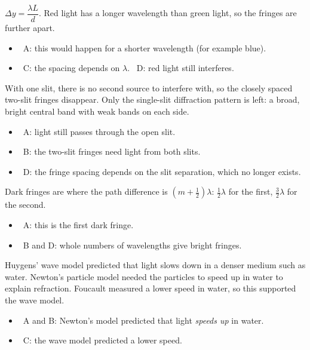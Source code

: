 \documentclass[12pt]{article}
\begin{document}
\begin{practiceanswers}
\begin{practiceans}
  $\Delta y = \dfrac{\lambda L}{d}$. Red light has a longer wavelength than green light, so the fringes
  are further apart.
  \begin{itemize}
    \item \xmark\ A: this would happen for a shorter wavelength (for example blue).
    \item \xmark\ C: the spacing depends on $\lambda$. \quad \xmark\ D: red light still interferes.
  \end{itemize}
\end{practiceans}

\begin{practiceans}
  With one slit, there is no second source to interfere with, so the closely spaced two-slit fringes
  disappear. Only the single-slit diffraction pattern is left: a broad, bright central band with weak
  bands on each side.
  \begin{itemize}
    \item \xmark\ A: light still passes through the open slit.
    \item \xmark\ B: the two-slit fringes need light from both slits.
    \item \xmark\ D: the fringe spacing depends on the slit separation, which no longer exists.
  \end{itemize}
\end{practiceans}

\begin{practiceans}
  Dark fringes are where the path difference is $(m + \frac{1}{2})\lambda$: $\frac{1}{2}\lambda$ for the
  first, $\frac{3}{2}\lambda$ for the second.
  \begin{itemize}
    \item \xmark\ A: this is the first dark fringe.
    \item \xmark\ B and D: whole numbers of wavelengths give bright fringes.
  \end{itemize}
\end{practiceans}

\begin{practiceans}
  Huygens' wave model predicted that light slows down in a denser medium such as water. Newton's
  particle model needed the particles to speed up in water to explain refraction. Foucault measured a
  lower speed in water, so this supported the wave model.
  \begin{itemize}
    \item \xmark\ A and B: Newton's model predicted that light \emph{speeds up} in water.
    \item \xmark\ C: the wave model predicted a lower speed.
  \end{itemize}
\end{practiceans}


\end{practiceanswers}
\end{document}
